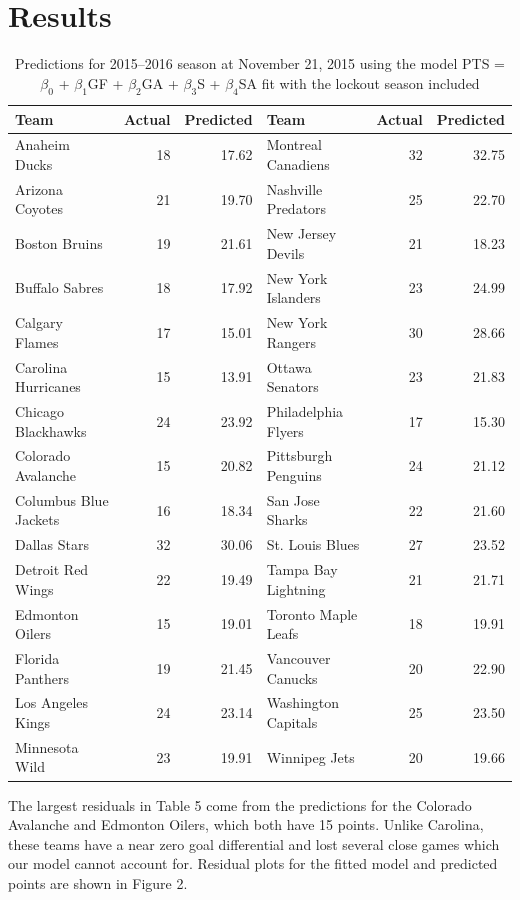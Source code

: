 \documentclass[12pt]{article}
\begin{document}
\section{Results}

\vspace{-5mm}
\begin{table}[ht]
\centering
{\small
\begin{tabular}{lrr|lrr}
  \hline
Team & Actual & Predicted & Team & Actual & Predicted \\ 
  \hline
Anaheim Ducks & 18 & 17.62 & Montreal Canadiens & 32 & 32.75 \\ 
  Arizona Coyotes & 21 & 19.70 & Nashville Predators & 25 & 22.70 \\ 
  Boston Bruins & 19 & 21.61 & New Jersey Devils & 21 & 18.23 \\ 
  Buffalo Sabres & 18 & 17.92 & New York Islanders & 23 & 24.99 \\ 
  Calgary Flames & 17 & 15.01 & New York Rangers & 30 & 28.66 \\ 
  Carolina Hurricanes & 15 & 13.91 & Ottawa Senators & 23 & 21.83 \\ 
  Chicago Blackhawks & 24 & 23.92 & Philadelphia Flyers & 17 & 15.30 \\ 
  Colorado Avalanche & 15 & 20.82 & Pittsburgh Penguins & 24 & 21.12 \\ 
  Columbus Blue Jackets & 16 & 18.34 & San Jose Sharks & 22 & 21.60 \\ 
  Dallas Stars & 32 & 30.06 & St. Louis Blues & 27 & 23.52 \\ 
  Detroit Red Wings & 22 & 19.49 & Tampa Bay Lightning & 21 & 21.71 \\ 
  Edmonton Oilers & 15 & 19.01 & Toronto Maple Leafs & 18 & 19.91 \\ 
  Florida Panthers & 19 & 21.45 & Vancouver Canucks & 20 & 22.90 \\ 
  Los Angeles Kings & 24 & 23.14 & Washington Capitals & 25 & 23.50 \\ 
  Minnesota Wild & 23 & 19.91 & Winnipeg Jets & 20 & 19.66 \\ 
   \hline
\end{tabular}
}
\caption{Predictions for 2015--2016 season at November 21, 2015 using the model PTS = $\beta_{0}$ + $\beta_{1}$GF + $\beta_{2}$GA + $\beta_{3}$S + $\beta_{4}$SA fit with the lockout season included} 
\end{table}
\noindent
The largest residuals in Table 5 come from the predictions for the Colorado Avalanche and Edmonton Oilers, which both have 15 points. Unlike Carolina, these teams have a near zero goal differential and lost several close games which our model cannot account for. Residual plots for the fitted model and predicted points are shown in Figure 2.
\end{document}
